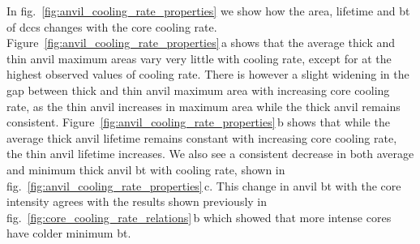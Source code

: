 In fig.~\ref{fig:anvil_cooling_rate_properties} we show how the area, lifetime and \acrshort{bt} of \acrshort{dcc}s changes with the core cooling rate.
Figure~\ref{fig:anvil_cooling_rate_properties}\,a shows that the average thick and thin anvil maximum areas vary very little with cooling rate, except for at the highest observed values of cooling rate.
There is however a slight widening in the gap between thick and thin anvil maximum area with increasing core cooling rate, as the thin anvil increases in maximum area while the thick anvil remains consistent.
Figure~\ref{fig:anvil_cooling_rate_properties}\,b shows that while the average thick anvil lifetime remains constant with increasing core cooling rate, the thin anvil lifetime increases.
We also see a consistent decrease in both average and minimum thick anvil \acrshort{bt} with cooling rate, shown in fig.~\ref{fig:anvil_cooling_rate_properties}\,c.
This change in anvil \acrshort{bt} with the core intensity agrees with the results shown previously in fig.~\ref{fig:core_cooling_rate_relations}\,b which showed that more intense cores have colder minimum \acrshort{bt}.

